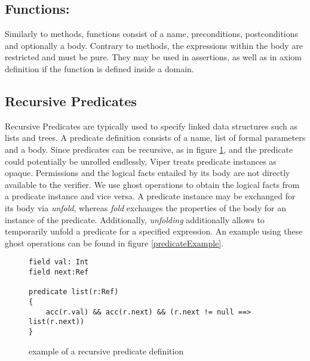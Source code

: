 \documentclass[12pt]{article}
\begin{document}
\subsection{Functions: }
Similarly to methods, functions consist of a name, preconditions, postconditions and optionally a body. Contrary to methods, the expressions within the body are restricted and must be pure. They may be used in assertions, as well as in axiom definition if the function is defined inside a domain.

\subsection{Recursive Predicates}

Recursive Predicates\cite{parkinson2005separation} are typically used to specify linked data structures such as lists and trees. A predicate definition consists of a name,  list of formal parameters and a body. 
Since predicates can be recursive, as in figure \ref{recursivePredicate}, and the predicate could potentially be unrolled endlessly, Viper treats predicate instances as opaque. Permissions and the logical facts entailed by its body are not directly available to the verifier. We use ghost operations to obtain the logical facts from a predicate instance and vice versa.
A predicate instance may be exchanged for its body via \textit{unfold}, whereas \textit{fold} exchanges the properties of the body for an instance of the predicate. Additionally, \textit{unfolding} additionally allows to temporarily unfold a predicate for a specified expression. An example using these ghost operations can be found in figure \ref{predicateExample}.

\begin{figure}[h]
  \centering
\begin{lstlisting}
field val: Int
field next:Ref

predicate list(r:Ref)
{
    acc(r.val) && acc(r.next) && (r.next != null ==> list(r.next))
}
\end{lstlisting}
\caption[recursive predicate]
   {example of a recursive predicate definition}
\label{recursivePredicate}
\end{figure}
\end{document}
